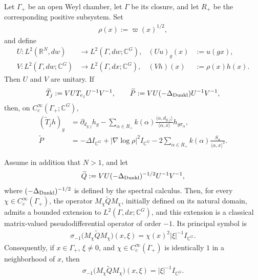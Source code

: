 \documentclass{amsart}
\begin{document}
\begin{lemma}\label{lem:Dunkl-chamber-folding-symbol}
Let \(\Gamma_+\) be an open Weyl chamber, let \(\Gamma\) be its closure, and let \(R_+\) be the corresponding positive subsystem. Set
\begin{align*}
\rho(x):=\varpi(x)^{1/2},
\end{align*}
and define
\begin{align*}
U:L^2(\mathbb R^N,dw)&\longrightarrow L^2(\Gamma,dw;\mathbb C^G),
&
(Uu)_g(x)&:=u(gx),\\
V:L^2(\Gamma,dw;\mathbb C^G)&\longrightarrow L^2(\Gamma,dx;\mathbb C^G),
&
(Vh)(x)&:=\rho(x)h(x).
\end{align*}
Then \(U\) and \(V\) are unitary. If
\begin{align*}
\widetilde T_j
:=
VUT_{e_j}U^{-1}V^{-1},
\qquad
\widetilde P
:=
VU(-\Delta_{{\rm Dunkl}})U^{-1}V^{-1},
\end{align*}
then, on \(C_c^\infty(\Gamma_+;\mathbb C^G)\),
\begin{align}
(\widetilde T_jh)_g
&=
\partial_{d_{g,j}}h_g
-
\sum_{\alpha\in R_+}
k(\alpha)
\frac{\langle\alpha,d_{g,j}\rangle}
{\langle\alpha,x\rangle}
h_{g\sigma_\alpha},
\label{eq:Dunkl-folded-T}\\
\widetilde P
&=
-\Delta I_{\mathbb C^G}
+
|\nabla\log\rho|^2I_{\mathbb C^G}
-
2\sum_{\alpha\in R_+}
k(\alpha)
\frac{S_\alpha}{\langle\alpha,x\rangle^2}.
\label{eq:Dunkl-folded-Laplacian}
\end{align}

Assume in addition that \(N>1\), and let
\begin{align*}
\widetilde Q
:=
VU(-\Delta_{{\rm Dunkl}})^{-1/2}U^{-1}V^{-1},
\end{align*}
where \((-\Delta_{{\rm Dunkl}})^{-1/2}\) is defined by the spectral calculus.
Then, for every \(\chi\in C_c^\infty(\Gamma_+)\), the operator
\(M_\chi\widetilde Q M_\chi\), initially defined on its natural
domain, admits a bounded extension to
\(L^2(\Gamma,dx;\mathbb C^G)\), and this extension is a classical
matrix-valued pseudodifferential operator of order \(-1\). Its
principal symbol is
\begin{align*}
\sigma_{-1}
\big(
M_\chi\widetilde Q M_\chi
\big)(x,\xi)
=
\chi(x)^2|\xi|^{-1}I_{\mathbb C^G}.
\end{align*}
Consequently, if \(x\in\Gamma_+\), \(\xi\neq0\), and
\(\chi\in C_c^\infty(\Gamma_+)\) is identically \(1\) in a
neighborhood of \(x\), then
\begin{align}
\sigma_{-1}
\big(
M_\chi\widetilde Q M_\chi
\big)(x,\xi)
=
|\xi|^{-1}I_{\mathbb C^G}.
\label{eq:Dunkl-folded-Q-principal-symbol}
\end{align}
\end{lemma}
\end{document}
